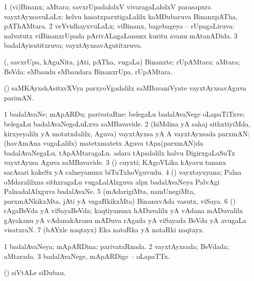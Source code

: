 \bentry
{} 
\gl{\gu}
\expl{}
\bmng
\bnum
\num{1} (vi)Binanx; aMtara; savxrUpadalolxV vivaragaLalolxV parasapxra vayxtAyxsavuLaLx:  kelvu hasatxparxtigaLalilx kaMDubaruva BinanxpATha, pAThAMtara. 
\num{2} veYvidhayxvuLaLx; viBinanx, bagebageya -- rUpagaLiruva:  nalvatutx viBinanxrUpada pArivALagaLanunx kuritu avanu mAtanADida. 
\num{3} badalAyisutitxruva; vayxtAyxsavAgutitxruva. 
\enum
\emng
\eentry

\bentry
{} 
\gl{\nA}
\expl{}
\bmng
 (\rUpa, savxrUpa, kAguNita, jAti, pATha, \mo vugaLa) Binanxte; rUpAMtara; aMtara; BeVda:  eMbaudu  eMbaudara BinanxrUpa, rUpAMtara. 
\emng
\eentry

\bentry
{} 
\gl{\nA}
\expl{}
\bmng
 (\saMshA) saMKAyxshAsitxrXVya parxyoVgadalilx saMBavaniVyate vayxtAyxsavAguva parimAN. 
\emng
\eentry

\bentry
{} 
\gl{\nA}
\expl{}
\bmng
\bnum
\num{1} badalAvaNe; mApARDu; parivataRne:  belegaLu badalAvaNege oLapaTiTxve; belegaLu badalAvaNegoLuLxva saMBavavide. 
\num{2} (hiMdina yA sahaj sithxtiyiMda, kirxyeyalilx yA motatxdalilx, Aguva) vayxtAyxsa yA A vayxtAyxsada parxmAN:  (havAmAna \mo vugaLalilx) matetxmatetx Aguva tApa(parxmAN)da badalAvaNegaLu, tApAMtaragaLu.  adara tApadalilx halvu DigirxgaLaSuTx vayxtAyxsa Aguva saMBavavide. 
\num{3} (\Kavi) cuyxti; KAgoVLika kAyavu tananx sarAsari kakeSx yA calneyanunx biTuTxhoVguvudu. 
\num{4} (\ga) vayxtayxyana; Palna oMdaralilxna sithxragaLu \mo vugaLalAlxguva alpx badalAvaNeya PalvAgi PalnadalAlxguva badalAvaNe. 
\num{5} (mAdarigiMta, namUnegiMta, parxmANkikxMta, jAti yA vagaRkikxMta) BinanxvAda vasutx, viSaya. 
\num{6} (\saM) rAgaBeVda yA viSayaBeVda; kaqtiyanunx hADuvalilx yA vAdana mADuvalilx gAyakanu yA vAdanakAranu mADuva rAgada yA viSayada BeVda yA avugaLa visatxraN. 
\num{7} (bAYxle naqtayx) Eka nataRka yA nataRki naqtayx. 
\enum
\emng
\eentry

\bentry
{} 
\gl{\gu}
\expl{}
\bmng
\bnum
\num{1} badalAvaNeya; mApARDina; parivataRnada. 
\num{2} vayxtAyxsada; BeVdada; aMtarada. 
\num{3} badalAvaNege, mApARDige -- oLapaTTx. 
\enum
\emng
\eentry

\bentry
{} 
\gl{\nA}
\expl{}
\bmng
 (\veYshA) siVtALe siDubau. 
\emng
\eentry

